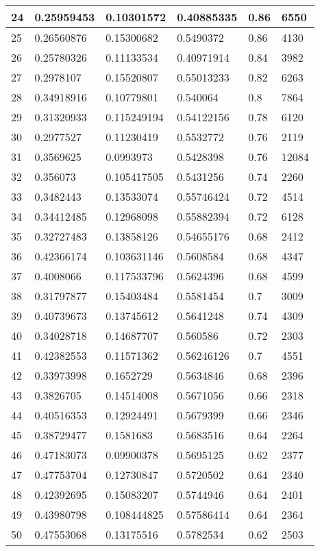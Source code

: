 \begin{longtable}{|l|l|l|l|l|l|}
24 & 0.25959453 & 0.10301572 & 0.40885335 & 0.86 & 6550 \\ \hline 
25 & 0.26560876 & 0.15300682 & 0.5490372 & 0.86 & 4130 \\ \hline 
26 & 0.25780326 & 0.11133534 & 0.40971914 & 0.84 & 3982 \\ \hline 
27 & 0.2978107 & 0.15520807 & 0.55013233 & 0.82 & 6263 \\ \hline 
28 & 0.34918916 & 0.10779801 & 0.540064 & 0.8 & 7864 \\ \hline 
29 & 0.31320933 & 0.115249194 & 0.54122156 & 0.78 & 6120 \\ \hline 
30 & 0.2977527 & 0.11230419 & 0.5532772 & 0.76 & 2119 \\ \hline 
31 & 0.3569625 & 0.0993973 & 0.5428398 & 0.76 & 12084 \\ \hline 
32 & 0.356073 & 0.105417505 & 0.5431256 & 0.74 & 2260 \\ \hline 
33 & 0.3482443 & 0.13533074 & 0.55746424 & 0.72 & 4514 \\ \hline 
34 & 0.34412485 & 0.12968098 & 0.55882394 & 0.72 & 6128 \\ \hline 
35 & 0.32727483 & 0.13858126 & 0.54655176 & 0.68 & 2412 \\ \hline 
36 & 0.42366174 & 0.103631146 & 0.5608584 & 0.68 & 4347 \\ \hline 
37 & 0.4008066 & 0.117533796 & 0.5624396 & 0.68 & 4599 \\ \hline 
38 & 0.31797877 & 0.15403484 & 0.5581454 & 0.7 & 3009 \\ \hline 
39 & 0.40739673 & 0.13745612 & 0.5641248 & 0.74 & 4309 \\ \hline 
40 & 0.34028718 & 0.14687707 & 0.560586 & 0.72 & 2303 \\ \hline 
41 & 0.42382553 & 0.11571362 & 0.56246126 & 0.7 & 4551 \\ \hline 
42 & 0.33973998 & 0.1652729 & 0.5634846 & 0.68 & 2396 \\ \hline 
43 & 0.3826705 & 0.14514008 & 0.5671056 & 0.66 & 2318 \\ \hline 
44 & 0.40516353 & 0.12924491 & 0.5679399 & 0.66 & 2346 \\ \hline 
45 & 0.38729477 & 0.1581683 & 0.5683516 & 0.64 & 2264 \\ \hline 
46 & 0.47183073 & 0.09900378 & 0.5695125 & 0.62 & 2377 \\ \hline 
47 & 0.47753704 & 0.12730847 & 0.5720502 & 0.64 & 2340 \\ \hline 
48 & 0.42392695 & 0.15083207 & 0.5744946 & 0.64 & 2401 \\ \hline 
49 & 0.43980798 & 0.108444825 & 0.57586414 & 0.64 & 2364 \\ \hline 
50 & 0.47553068 & 0.13175516 & 0.5782534 & 0.62 & 2503 \\ \hline 
\end{longtable}